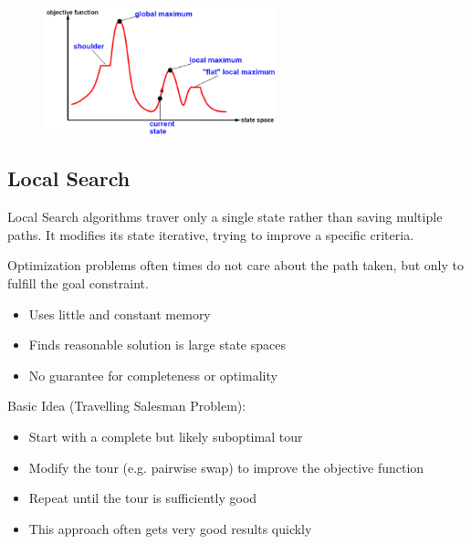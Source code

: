\documentclass[
../../EiKI_Summary.tex,
]
{subfiles}
\begin{document}
\begin{figure}[H]
    \centering
    \includegraphics[width=0.6\textwidth]{Pics/04/GlobalLocalOptimum.png}
\end{figure}

\newpage

\subsection{Local Search}
\begin{defbox*}
    Local Search algorithms traver only a single state rather than saving multiple paths. It modifies its state iterative, trying to improve a specific criteria.
\end{defbox*}

Optimization problems often times do not care about the path taken, but only to fulfill the goal constraint.

\begin{minipage}
    [t]{0.5\textwidth}
    \begin{defbox}
        [Advantages]
        \begin{itemize}
            \item Uses little and constant memory
            \item Finds reasonable solution is large state spaces
        \end{itemize}
    \end{defbox}
\end{minipage}
\begin{minipage}
    [t]{0.5\textwidth}
    \begin{defbox}
        [Disadvantages]
        \begin{itemize}
            \item No guarantee for completeness or optimality
        \end{itemize}
    \end{defbox}
\end{minipage}

Basic Idea (Travelling Salesman Problem):
\begin{itemize}
    \item Start with a complete but likely suboptimal tour
    \item Modify the tour (e.g. pairwise swap) to improve the objective function
    \item Repeat until the tour is sufficiently good
    \item This approach often gets very good results quickly
\end{itemize}
\end{document}
